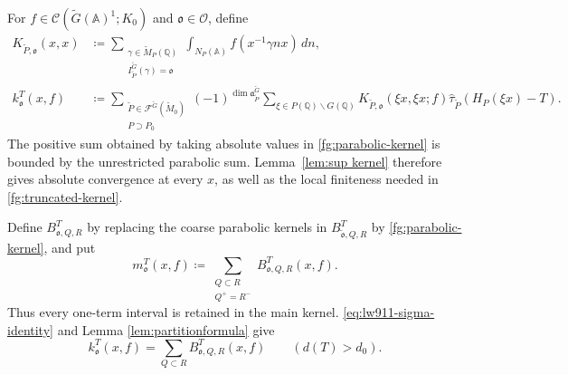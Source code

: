 \documentclass[12pt]{amsart}
\theoremstyle{definition}
\theoremstyle{plain}
\theoremstyle{remark}
\def\Q{\mathbb{Q}}%
\def\A{\mathbb{A}}%
\newcommand{\fa}{\mathfrak{a}}
\newcommand{\fo}{\mathfrak{o}}
\newcommand{\cC}{\mathcal{C}}
\newcommand{\cF}{\mathcal{F}}
\newcommand{\cO}{\mathcal{O}}
\numberwithin{equation}{section}
\newcommand{\tG}{\widetilde{G}}
\newcommand{\tM}{\widetilde{M}}
\newcommand{\tP}{\widetilde{P}}
\newcommand{\tfo}{\widetilde{\mathfrak{o}}}
\begin{document}
For $f\in\cC(\tG(\A)^1;K_0)$ and $\fo\in\cO$, define
\begin{align}
 K_{\tP,\fo}(x,x)
 &\coloneqq\sum_{\substack{\gamma\in\tM_P(\Q)\\
                    I_{\tP}^{\tG}(\gamma)=\fo}}
       \int_{N_P(\A)}f(x^{-1}\gamma n x)\,dn,
       \label{fg:parabolic-kernel}\\
 k_\fo^T(x,f)
 &\coloneqq\sum_{\substack{\tP\in\cF^{\tG}(\tM_0)\\P\supset P_0}}
       (-1)^{\dim\fa_{\tP}^{\tG}}
       \sum_{\xi\in P(\Q)\backslash G(\Q)}
       K_{\tP,\fo}(\xi x,\xi x;f)
       \widehat\tau_{\tP}(H_P(\xi x)-T).
       \label{fg:truncated-kernel}
\end{align}
The positive sum obtained by taking absolute values in
\eqref{fg:parabolic-kernel} is bounded by the unrestricted
parabolic sum. Lemma~\ref{lem:sup kernel} therefore gives
absolute convergence at every $x$, as well as the local
finiteness needed in \eqref{fg:truncated-kernel}.

Define $B_{\fo,Q,R}^T$ by replacing the coarse parabolic
kernels in $B_{\tfo,Q,R}^T$ by
\eqref{fg:parabolic-kernel}, and put
\[
 m_\fo^T(x,f)
 \coloneqq\sum_{\substack{Q\subset R\\Q^+=R^-}}
       B_{\fo,Q,R}^T(x,f).
\]
Thus every one-term interval is retained in the main kernel.
\eqref{eq:lw911-sigma-identity} and Lemma \ref{lem:partitionformula} give
\[
 k_\fo^T(x,f)=\sum_{Q\subset R}B_{\fo,Q,R}^T(x,f)
 \qquad(d(T)>d_0).
\]
\end{document}
